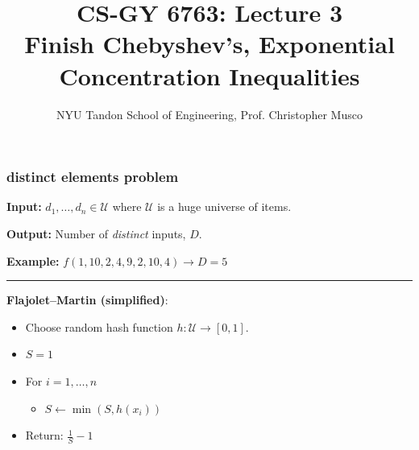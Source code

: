 \documentclass[compress]{beamer}
\title{CS-GY 6763: Lecture 3 \\  Finish Chebyshev's, Exponential Concentration Inequalities}
\author{NYU Tandon School of Engineering, Prof. Christopher Musco}
\date{}
\begin{document}
\begin{frame}
	\titlepage 
\end{frame}


\begin{frame}
	\frametitle{distinct elements problem}
\textbf{Input:} $d_1, \ldots, d_n \in \mathcal{U}$ where $\mathcal{U}$ is a huge universe of items. 

	\textbf{Output:} Number of \emph{distinct} inputs, $D$.

\textbf{Example:} $f(1, 10, 2, 4, 9, 2, 10, 4) \rightarrow D = 5$

\vspace{.5em}
\hrule
\vspace{.5em}

\textbf{Flajolet–Martin (simplified)}:
\begin{itemize}
	\item Choose random hash function $h: \mathcal{U} \rightarrow [0,1]$.
	\item $S = 1$ 
	\item For $i = 1, \ldots, n$
	\begin{itemize}
		\item $S \leftarrow \min(S, h(x_i))$
	\end{itemize} 
	\item Return: $\frac{1}{S} - 1$
\end{itemize}
\end{frame}
\end{document}
